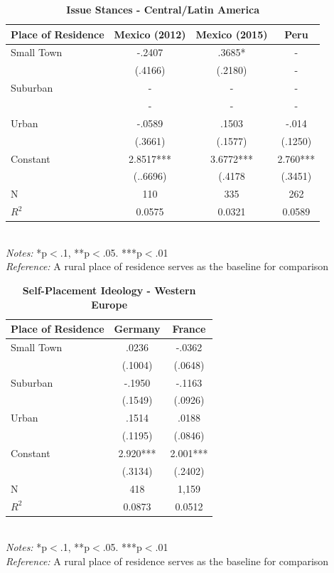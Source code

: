 \documentclass[12pt, titlepage]{article}
\newcommand\e{\emph}
\newcommand\tb{\textbf}
\begin{document}
\begin{singlespace}
	\begin{table}[H]
		\centering
		\caption{\tb{Issue Stances - Central/Latin America}}
		\begin{tabulary}{\linewidth}{l c c c}
			\\
			\hline
			\tb{Place of Residence}&\tb{Mexico (2012)}&\tb{Mexico (2015)} &\tb{Peru}\\
			\hline
			Small Town&-.2407 & .3685*& - \\
			&(.4166)  & (.2180)&-\\
			Suburban&- &- &-\\
			& -  & -&-\\
			Urban &-.0589 & .1503&-.014\\
			&(.3661) & (.1577)&(.1250)\\
			Constant& 2.8517*** &3.6772***&2.760*** \\
			& (..6696)  & (.4178&(.3451)\\
			N&110 & 335&262\\
			$R^2$&0.0575 & 0.0321&0.0589 \\
			\hline 
		\end{tabulary}
		\\
		\e{Notes:} *p$<$.1, **p$<$.05. ***p$<$.01 \\
		\e{Reference:} A rural place of residence serves as the baseline for comparison
		\label{CentAmerLib}
	\end{table}
\end{singlespace}

\begin{singlespace}
	\begin{table}[H]
		\centering
		\caption{\tb{Self-Placement Ideology - Western Europe}}
		\begin{tabulary}{\linewidth}{l c c }
			\\
			\hline
			\tb{Place of Residence}&\tb{Germany}&\tb{France} \\
			\hline
			Small Town& .0236 & -.0362   \\
			&(.1004)  & (.0648)\\
			Suburban&-.1950&-.1163 \\
			&(.1549) &  (.0926) \\
			Urban & .1514&.0188 \\
			&(.1195) &(.0846) \\
			Constant&2.920*** &2.001*** \\
			&(.3134) &(.2402) \\
			N&418& 1,159\\
			$R^2$&0.0873 & 0.0512 \\
			\hline 
\end{tabulary}
\\
\e{Notes:} *p$<$.1, **p$<$.05. ***p$<$.01 \\
\e{Reference:} A rural place of residence serves as the baseline for comparison
\label{WELib}
\end{table}
\end{singlespace}
\end{document}
